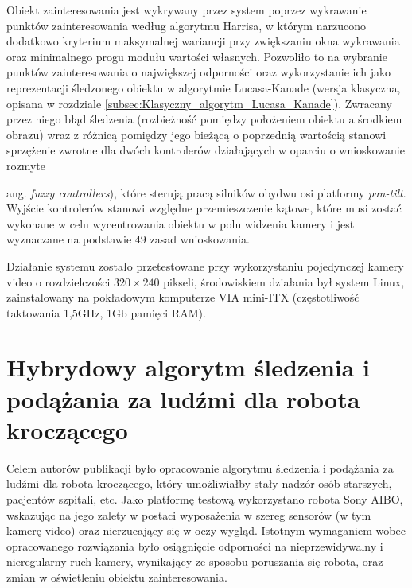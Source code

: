Obiekt zainteresowania jest wykrywany przez system poprzez wykrawanie punktów zainteresowania według algorytmu Harrisa, w którym narzucono dodatkowo kryterium maksymalnej wariancji przy zwiększaniu okna wykrawania oraz minimalnego progu modułu wartości własnych. Pozwoliło to na wybranie punktów zainteresowania o największej odporności oraz wykorzystanie ich jako reprezentacji śledzonego obiektu w algorytmie Lucasa-Kanade (wersja klasyczna, opisana w rozdziale \ref{subsec:Klasyczny_algorytm_Lucasa_Kanade}).
Zwracany przez niego błąd śledzenia (rozbieżność pomiędzy położeniem obiektu a środkiem obrazu) wraz z różnicą pomiędzy jego bieżącą o poprzednią wartością stanowi sprzężenie zwrotne dla dwóch kontrolerów działających w oparciu o wnioskowanie rozmyte {ang. \textit{fuzzy controllers}), które sterują pracą silników obydwu osi platformy \textit{pan-tilt}. Wyjście kontrolerów stanowi względne przemieszczenie kątowe, które musi zostać wykonane w celu wycentrowania obiektu w polu widzenia kamery i jest wyznaczane na podstawie 49 zasad wnioskowania.

Działanie systemu zostało przetestowane przy wykorzystaniu pojedynczej kamery video o rozdzielczości $320 \times 240$ pikseli, środowiskiem działania był system Linux, zainstalowany na pokładowym komputerze VIA mini-ITX (częstotliwość taktowania 1,5GHz, 1Gb pamięci RAM).

\section{Hybrydowy algorytm śledzenia i podążania za ludźmi dla robota kroczącego}
\label{sec:Przyklad_Liem2008}

Celem autorów publikacji \cite{Liem2008} było opracowanie algorytmu śledzenia i podążania za ludźmi dla robota kroczącego, który umożliwiałby stały nadzór osób starszych, pacjentów szpitali, etc. Jako platformę testową wykorzystano robota Sony AIBO, wskazując na jego zalety w postaci wyposażenia w szereg sensorów (w tym kamerę video) oraz nierzucający się w oczy wygląd. Istotnym wymaganiem wobec opracowanego rozwiązania było osiągnięcie odporności na nieprzewidywalny i nieregularny ruch kamery, wynikający ze sposobu poruszania się robota, oraz zmian w oświetleniu obiektu zainteresowania.

}
